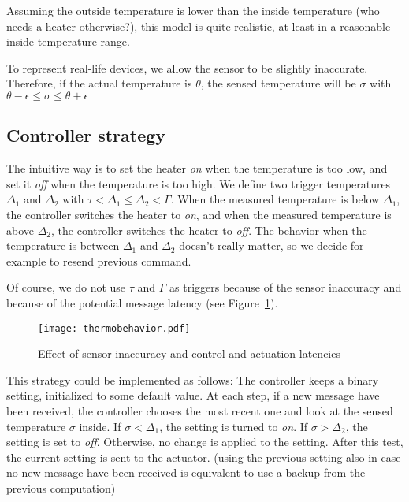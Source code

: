 Assuming the outside temperature is lower than the inside temperature (who needs a heater otherwise?), this model is quite realistic, at least in a reasonable inside temperature range.

To represent real-life devices, we allow the sensor to be slightly inaccurate. Therefore, if the actual temperature is $\theta$, the sensed temperature will be $\sigma$ with 
$\theta - \epsilon \leq \sigma \leq \theta + \epsilon $



\subsection{Controller strategy}

The intuitive way is to set the heater \textit{on} when the temperature is too low, and set it \textit{off} when the temperature is too high. We define two trigger temperatures $\Delta_1$ and $\Delta_2$ with $\tau < \Delta_1 \leq \Delta_2 < \Gamma$. 
When the measured temperature is below $\Delta_1$, the controller switches the heater to \textit{on}, and 
when the measured temperature is above $\Delta_2$, the controller switches the heater to \textit{off}. 
The behavior when the temperature is between $\Delta_1$ and $\Delta_2$ doesn't really matter, so we decide for example to resend previous command.

Of course, we do not use $\tau$ and $\Gamma$ as triggers because of the sensor inaccuracy and because of the potential message latency (see Figure~\ref{trig}).

\begin{figure}
\begin{center}
\texttt{[image: thermobehavior.pdf]}
\caption{Effect of sensor inaccuracy and control and actuation latencies}\label{trig}
\end{center}
\end{figure}

This strategy could be implemented as follows: The controller keeps a binary setting, initialized to some default value. At each step, if a new message have been received, the controller chooses the most recent one and look at the sensed temperature $\sigma$ inside.
If $\sigma < \Delta_1$, the setting is turned to \textit{on}. If $\sigma > \Delta_2$, the setting is set to \textit{off}. Otherwise, no change is applied to the setting. After this test, the current setting is sent to the actuator.
(using the previous setting also in case no new message have been received is equivalent to use a backup from the previous computation)


